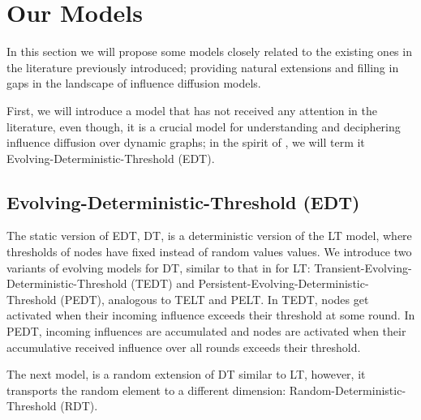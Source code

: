 \documentclass[twocolumn, 10pt]{article}
\begin{document}
\section{Our Models}
In this section we will propose some models closely related to the existing ones in the literature previously introduced; providing natural extensions and filling in gaps in the landscape of influence diffusion models.

First, we will introduce a model that has not received any attention in the literature, even though, it is a crucial model for understanding and deciphering influence diffusion over dynamic graphs; in the spirit of \cite{gay}, we will term it Evolving-Deterministic-Threshold (EDT).
\subsection{Evolving-Deterministic-Threshold (EDT)}
The static version of EDT, DT, is a deterministic version of the LT model, where thresholds of nodes have fixed instead of random values values. We introduce two variants of evolving models for DT, similar to that in \cite{gay} for LT: Transient-Evolving-Deterministic-Threshold (TEDT) and Persistent-Evolving-Deterministic-Threshold (PEDT), analogous to TELT and PELT. In TEDT, nodes get activated when their incoming influence exceeds their threshold at some round. In PEDT, incoming influences are accumulated and nodes are activated when their accumulative received influence over all rounds exceeds their threshold.

The next model, is a random extension of DT similar to LT, however, it transports the random element to a different dimension: Random-Deterministic-Threshold (RDT).
\end{document}
